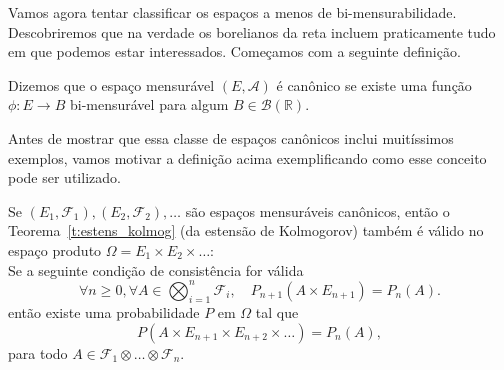 Vamos agora tentar classificar os espaços a menos de bi-mensurabilidade.
Descobriremos que na verdade os borelianos da reta incluem praticamente tudo em que podemos estar interessados.
Começamos com a seguinte definição.

\begin{definition}
  Dizemos que o espaço mensurável $(E, \mathcal{A})$ é canônico  se existe uma função $\phi: E \to B$ bi-mensurável para algum $B \in \mathcal{B}(\mathbb{R})$.
\end{definition}

Antes de mostrar que essa classe de espaços canônicos inclui muitíssimos exemplos, vamos motivar a definição acima exemplificando como esse conceito pode ser utilizado.

\begin{theorem}
  Se $(E_1,\mathcal{F}_1), (E_2,\mathcal{F}_2), \dots$ são espaços mensuráveis canônicos, então o Teorema~\ref{t:estens_kolmog} (da estensão de Kolmogorov)
  também é válido no espaço produto $\Omega = E_1 \times E_2 \times \dots$: \\
  Se a seguinte condição de consistência for válida
  \begin{equation}
   \forall n\ge 0, \forall A \in \bigotimes_{i=1}^n \mathcal{F}_i,\quad P_{n+1}(A\times E_{n+1})=P_n(A).
  \end{equation}
  então existe uma probabilidade $P$ em $\Omega$ tal que
  \begin{equation}
    P(A \times E_{n + 1} \times E_{n + 2} \times \dots)
    = P_n (A),
  \end{equation}
  para todo $A \in \mathcal{F}_1 \otimes \dots \otimes \mathcal{F}_n$.
\end{theorem}

